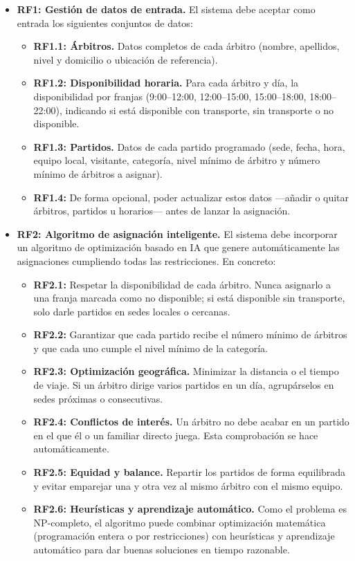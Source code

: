 \documentclass[11pt,a4paper,spanish]{book}
\numberwithin{equation}{chapter}
\numberwithin{figure}{chapter}
\numberwithin{table}{chapter}
\begin{document}
\begin{itemize}
\item {\bf RF1: Gestión de datos de entrada.} El sistema debe aceptar como entrada los siguientes conjuntos de datos:
    \begin{itemize}
    \item {\bf RF1.1: Árbitros.} Datos completos de cada árbitro (nombre, apellidos, nivel y domicilio o ubicación de referencia).
    \item {\bf RF1.2: Disponibilidad horaria.} Para cada árbitro y día, la disponibilidad por franjas (9:00–12:00, 12:00–15:00, 15:00–18:00, 18:00–22:00), indicando si está disponible con transporte, sin transporte o no disponible.
    \item {\bf RF1.3: Partidos.} Datos de cada partido programado (sede, fecha, hora, equipo local, visitante, categoría, nivel mínimo de árbitro y número mínimo de árbitros a asignar).
    \item {\bf RF1.4:} De forma opcional, poder actualizar estos datos —añadir o quitar árbitros, partidos u horarios— antes de lanzar la asignación.
    \end{itemize}
\item {\bf RF2: Algoritmo de asignación inteligente.} El sistema debe incorporar un algoritmo de optimización basado en IA que genere automáticamente las asignaciones cumpliendo todas las restricciones. En concreto:
    \begin{itemize}
    \item {\bf RF2.1:} Respetar la disponibilidad de cada árbitro. Nunca asignarlo a una franja marcada como no disponible; si está disponible sin transporte, solo darle partidos en sedes locales o cercanas.
    \item {\bf RF2.2:} Garantizar que cada partido recibe el número mínimo de árbitros y que cada uno cumple el nivel mínimo de la categoría.
    \item {\bf RF2.3: Optimización geográfica.} Minimizar la distancia o el tiempo de viaje. Si un árbitro dirige varios partidos en un día, agrupárselos en sedes próximas o consecutivas.
    \item {\bf RF2.4: Conflictos de interés.} Un árbitro no debe acabar en un partido en el que él o un familiar directo juega. Esta comprobación se hace automáticamente.
    \item {\bf RF2.5: Equidad y balance.} Repartir los partidos de forma equilibrada y evitar emparejar una y otra vez al mismo árbitro con el mismo equipo.
    \item {\bf RF2.6: Heurísticas y aprendizaje automático.} Como el problema es NP-completo, el algoritmo puede combinar optimización matemática (programación entera o por restricciones) con heurísticas y aprendizaje automático para dar buenas soluciones en tiempo razonable.

\end{itemize}
\end{itemize}
\end{document}
